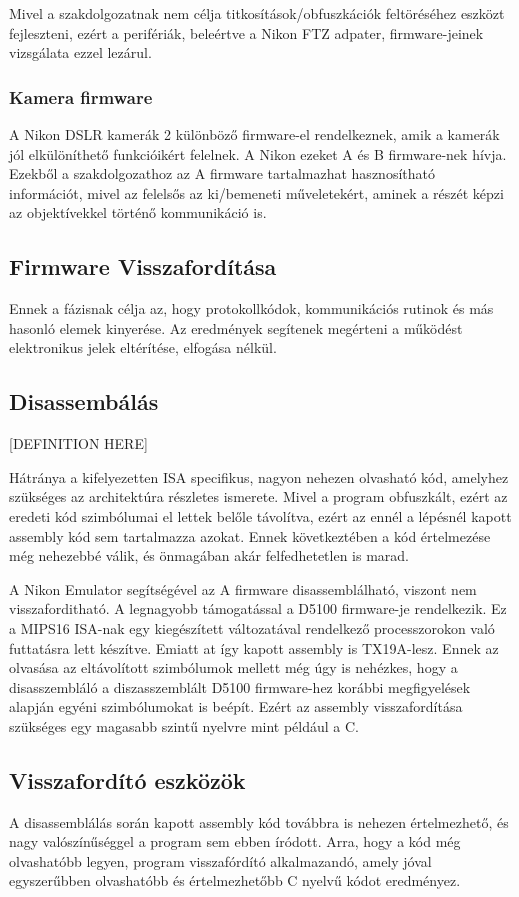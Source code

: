 Mivel a szakdolgozatnak nem célja titkosítások/obfuszkációk feltöréséhez eszközt fejleszteni, ezért a perifériák, beleértve a Nikon FTZ adpater, firmware-jeinek vizsgálata ezzel lezárul.
\subsubsection{Kamera firmware}
A Nikon DSLR kamerák 2 különböző firmware-el rendelkeznek, amik a kamerák jól elkülöníthető funkcióikért felelnek.
A Nikon ezeket A és B firmware-nek hívja\cite{nikon_support_firmware_list}.
Ezekből a szakdolgozathoz az A firmware tartalmazhat hasznosítható információt,
mivel az felelsős az ki/bemeneti műveletekért, aminek a részét képzi az objektívekkel történő kommunikáció is\cite{nikonhackers_understanding_firmware}.

\subsection{Firmware Visszafordítása}
Ennek a fázisnak célja az, hogy protokollkódok, kommunikációs rutinok és más hasonló elemek kinyerése.
Az eredmények segítenek megérteni a működést elektronikus jelek eltérítése, elfogása nélkül.
\subsection{Disassembálás}
[DEFINITION HERE]

Hátránya a kifelyezetten ISA specifikus, nagyon nehezen olvasható kód, amelyhez szükséges az architektúra részletes ismerete.
Mivel a program obfuszkált, ezért az eredeti kód szimbólumai el lettek belőle távolítva, ezért az ennél a lépésnél kapott assembly kód sem tartalmazza azokat.
Ennek következtében a kód értelmezése még nehezebbé válik, és önmagában akár felfedhetetlen is marad.

A Nikon Emulator segítségével az A firmware disassemblálható, viszont nem visszaforditható.
A legnagyobb támogatással a D5100 firmware-je rendelkezik. Ez a MIPS16 ISA-nak egy kiegészített változatával rendelkező processzorokon való futtatásra lett készítve.\cite{nikonhackers_understanding_firmware}
Emiatt at így kapott assembly is TX19A-lesz.
Ennek az olvasása az eltávolított szimbólumok mellett még úgy is nehézkes, hogy a disasszembláló a diszasszemblált D5100 firmware-hez korábbi megfigyelések alapján egyéni szimbólumokat is beépít.
Ezért az assembly visszafordítása szükséges egy magasabb szintű nyelvre mint például a C.

\subsection{Visszafordító eszközök}
A disassemblálás során kapott assembly kód továbbra is nehezen értelmezhető, és nagy valószínűséggel a program sem ebben íródott.
Arra, hogy a kód még olvashatóbb legyen, program visszafórdító alkalmazandó, amely jóval egyszerűbben olvashatóbb és értelmezhetőbb C nyelvű kódot eredményez. 

